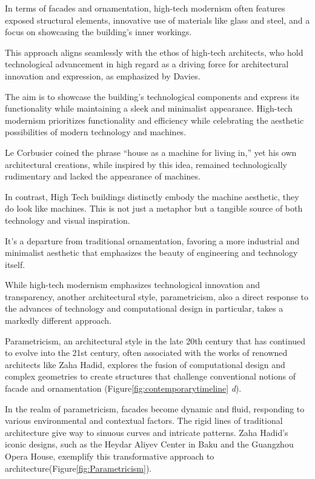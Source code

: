 In terms of facades and ornamentation, high-tech modernism often features exposed structural elements, innovative use of materials like glass and steel, and a focus on showcasing the building's inner workings.

This approach aligns seamlessly with the ethos of high-tech architects, who hold technological advancement in high regard as a driving force for architectural innovation and expression, as emphasized by Davies\cite{Davies1988}.

The aim is to showcase the building's technological components and express its functionality while maintaining a sleek and minimalist appearance.
High-tech modernism prioritizes functionality and efficiency while celebrating the aesthetic possibilities of modern technology and machines.

Le Corbusier coined the phrase ``house as a machine for living in,'' yet his own architectural creations, while inspired by this idea, remained technologically rudimentary and lacked the appearance of machines.

In contrast, High Tech buildings distinctly embody the machine aesthetic, they do look like machines.
This is not just a metaphor but a tangible source of both technology and visual inspiration\cite{Davies1988}.

It's a departure from traditional ornamentation, favoring a more industrial and minimalist aesthetic that emphasizes the beauty of engineering and technology itself.


While high-tech modernism emphasizes technological innovation and transparency, another architectural style, parametricism, also a direct response to the advances of technology and computational design in particular,  takes a markedly different approach.

Parametricism, an architectural style in the late 20th century that has continued to evolve into the 21st century, often associated with the works of renowned architects like Zaha Hadid, explores the fusion of computational design and complex geometries to create structures that challenge conventional notions of facade and ornamentation (Figure\ref{fig:contemporarytimeline} \textit{d}).

In the realm of parametricism, facades become dynamic and fluid, responding to various environmental and contextual factors.
The rigid lines of traditional architecture give way to sinuous curves and intricate patterns.
Zaha Hadid's iconic designs, such as the Heydar Aliyev Center in Baku and the Guangzhou Opera House, exemplify this transformative approach to architecture(Figure\ref{fig:Parametricism}).

